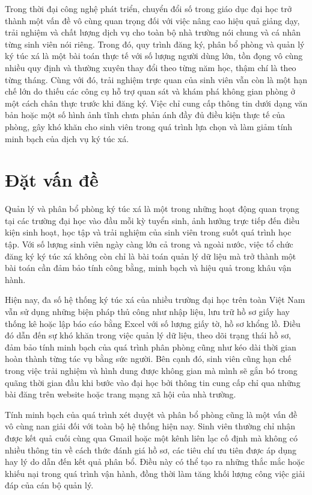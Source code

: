 \documentclass[../DoAn.tex]{subfiles}
\begin{document}
Trong thời đại công nghệ phát triển, chuyển đổi số trong giáo dục đại học trở thành một vấn đề vô cùng quan trọng đối với việc nâng cao hiệu quả giảng dạy, trải nghiệm và chất lượng dịch vụ cho toàn bộ nhà trường nói chung và cá nhân từng sinh viên nói riêng. Trong đó, quy trình đăng ký, phân bổ phòng và quản lý ký túc xá là một bài toán thực tế với số lượng người dùng lớn, tồn đọng vô cùng nhiều quy định và thường xuyên thay đổi theo từng năm học, thậm chí là theo từng tháng. Cùng với đó, trải nghiệm trực quan của sinh viên vẫn còn là một hạn chế lớn do thiếu các công cụ hỗ trợ quan sát và khám phá không gian phòng ở một cách chân thực trước khi đăng ký. Việc chỉ cung cấp thông tin dưới dạng văn bản hoặc một số hình ảnh tĩnh chưa phản ánh đầy đủ điều kiện thực tế của phòng, gây khó khăn cho sinh viên trong quá trình lựa chọn và làm giảm tính minh bạch của dịch vụ ký túc xá.

\section{Đặt vấn đề}
\label{section:1.1}

Quản lý và phân bổ phòng ký túc xá là một trong những hoạt động quan trọng tại các trường đại học vào đầu mỗi kỳ tuyển sinh, ảnh hưởng trực tiếp đến điều kiện sinh hoạt, học tập và trải nghiệm của sinh viên trong suốt quá trình học tập. Với số lượng sinh viên ngày càng lớn cả trong và ngoài nước, việc tổ chức đăng ký ký túc xá không còn chỉ là bài toán quản lý dữ liệu mà trở thành một bài toán cần đảm bảo tính công bằng, minh bạch và hiệu quả trong khâu vận hành.

Hiện nay, đa số hệ thống ký túc xá của nhiều trường đại học trên toàn Việt Nam vẫn sử dụng những biện pháp thủ công như nhập liệu, lưu trữ hồ sơ giấy hay thống kê hoặc lập báo cáo bằng Excel với số lượng giấy tờ, hồ sơ khổng lồ. Điều đó dẫn đến sự khó khăn trong việc quản lý dữ liệu, theo dõi trạng thái hồ sơ, đảm bảo tính minh bạch của quá trình phân phòng cũng như kéo dài thời gian hoàn thành từng tác vụ bằng sức người. Bên cạnh đó, sinh viên cũng hạn chế trong việc trải nghiệm và hình dung được không gian mà mình sẽ gắn bó trong quãng thời gian đầu khi bước vào đại học bởi thông tin cung cấp chỉ qua những bài đăng trên website hoặc trang mạng xã hội của nhà trường.


Tính minh bạch của quá trình xét duyệt và phân bổ phòng cũng là một vấn đề vô cùng nan giải đối với toàn bộ hệ thống hiện nay. Sinh viên thường chỉ nhận được kết quả cuối cùng qua Gmail hoặc một kênh liên lạc cố định mà không có nhiều thông tin về cách thức đánh giá hồ sơ, các tiêu chí ưu tiên được áp dụng hay lý do dẫn đến kết quả phân bổ. Điều này có thể tạo ra những thắc mắc hoặc khiếu nại trong quá trình vận hành, đồng thời làm tăng khối lượng công việc giải đáp của cán bộ quản lý.
\end{document}
